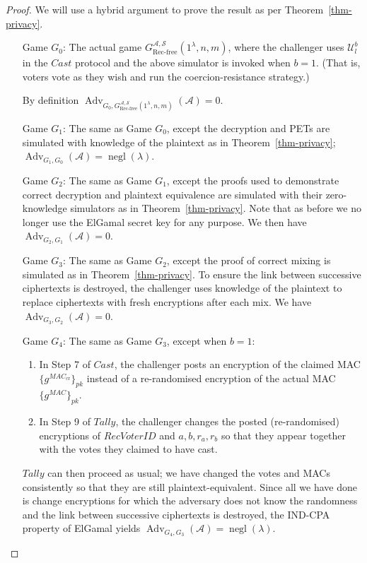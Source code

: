 \documentclass[12pt,a4paper]{article}
\DeclareMathOperator{\negl}{\text{negl}}
\DeclareMathOperator{\Adv}{\text{Adv}}
\theoremstyle{definition}
\newcommand{\receivedvid}{\mathit{RecVoterID}}
\newcommand{\Mac}{\mathit{MAC}}
\begin{document}
\begin{proof}
    We will use a hybrid argument to prove the result as per Theorem~\ref{thm-privacy}.
    \begin{itemize}[leftmargin=4em]
        \item[Game] $G_0$: The actual game $G^{\mathcal{A},\mathcal{S}}_\text{Rec-free}(1^\lambda,n,m)$, where the challenger uses $\mathcal{U}^b_l$ in the $\mathit{Cast}$ protocol and the above simulator is invoked when $b=1$.  (That is, voters vote as they wish and run the coercion-resistance strategy.)
        
        By definition $\Adv_{G_0,G^{\mathcal{A},\mathcal{S}}_{\text{Rec-free}}(1^\lambda,n,m)}(\mathcal{A}) = 0$.
    
        \item[Game] $G_1$: The same as Game $G_0$, except the decryption and PETs are simulated with knowledge of the plaintext as in Theorem~\ref{thm-privacy}; $\Adv_{G_1, G_0}(\mathcal{A})=\negl(\lambda)$.
    
        \item[Game] $G_2$: The same as Game $G_1$, except the proofs used to demonstrate correct decryption and plaintext equivalence are simulated with their zero-knowledge simulators as in Theorem~\ref{thm-privacy}. Note that as before we no longer use the ElGamal secret key for any purpose. We then have $\Adv_{G_2, G_1}(\mathcal{A})=0$.
 
        \item[Game] $G_3$: The same as Game $G_2$, except the proof of correct mixing is simulated as in Theorem~\ref{thm-privacy}. To ensure the link between successive ciphertexts is destroyed, the challenger uses knowledge of the plaintext to replace ciphertexts with fresh encryptions after each mix. We have $\Adv_{G_3, G_2}(\mathcal{A})=0$.
    
        \item[Game] $G_4$: The same as Game $G_3$, except when $b = 1$:
        \begin{enumerate}
            \item In Step 7 of $\mathit{Cast}$, the challenger posts an encryption of the claimed MAC $\{g^{\Mac_{\text{cr}}}\}_{pk}$ instead of a re-randomised encryption of the actual MAC $\{g^\Mac\}_{pk}$.
            \item In Step 9 of $\mathit{Tally}$, the challenger changes the posted (re-randomised) encryptions of $\receivedvid$ and $a, b, r_a, r_b$ so that they appear together with the votes they claimed to have cast.
        \end{enumerate}
        $\mathit{Tally}$ can then proceed as usual; we have changed the votes and MACs consistently so that they are still plaintext-equivalent. Since all we have done is change encryptions for which the adversary does not know the randomness and the link between successive ciphertexts is destroyed, the IND-CPA property of ElGamal yields $\Adv_{G_4, G_3}(\mathcal{A})=\negl(\lambda)$.
    

\end{itemize}
\end{proof}
\end{document}
